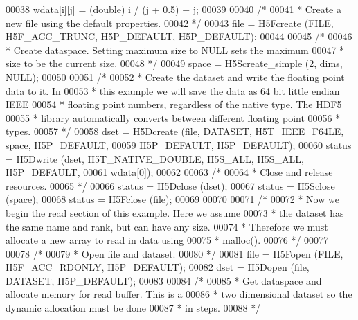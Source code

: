 \begin{DoxyCode}
00038             wdata[i][j] = (\textcolor{keywordtype}{double}) i / (j + 0.5) + j;
00039 
00040     \textcolor{comment}{/*}
00041 \textcolor{comment}{     * Create a new file using the default properties.}
00042 \textcolor{comment}{     */}
00043     file = H5Fcreate (FILE, H5F\_ACC\_TRUNC, H5P\_DEFAULT, H5P\_DEFAULT);
00044 
00045     \textcolor{comment}{/*}
00046 \textcolor{comment}{     * Create dataspace.  Setting maximum size to NULL sets the maximum}
00047 \textcolor{comment}{     * size to be the current size.}
00048 \textcolor{comment}{     */}
00049     space = H5Screate\_simple (2, dims, NULL);
00050 
00051     \textcolor{comment}{/*}
00052 \textcolor{comment}{     * Create the dataset and write the floating point data to it.  In}
00053 \textcolor{comment}{     * this example we will save the data as 64 bit little endian IEEE}
00054 \textcolor{comment}{     * floating point numbers, regardless of the native type.  The HDF5}
00055 \textcolor{comment}{     * library automatically converts between different floating point}
00056 \textcolor{comment}{     * types.}
00057 \textcolor{comment}{     */}
00058     dset = H5Dcreate (file, DATASET, H5T\_IEEE\_F64LE, space, H5P\_DEFAULT,
00059                 H5P\_DEFAULT, H5P\_DEFAULT);
00060     status = H5Dwrite (dset, H5T\_NATIVE\_DOUBLE, H5S\_ALL, H5S\_ALL, H5P\_DEFAULT,
00061                 wdata[0]);
00062 
00063     \textcolor{comment}{/*}
00064 \textcolor{comment}{     * Close and release resources.}
00065 \textcolor{comment}{     */}
00066     status = H5Dclose (dset);
00067     status = H5Sclose (space);
00068     status = H5Fclose (file);
00069 
00070 
00071     \textcolor{comment}{/*}
00072 \textcolor{comment}{     * Now we begin the read section of this example.  Here we assume}
00073 \textcolor{comment}{     * the dataset has the same name and rank, but can have any size.}
00074 \textcolor{comment}{     * Therefore we must allocate a new array to read in data using}
00075 \textcolor{comment}{     * malloc().}
00076 \textcolor{comment}{     */}
00077 
00078     \textcolor{comment}{/*}
00079 \textcolor{comment}{     * Open file and dataset.}
00080 \textcolor{comment}{     */}
00081     file = H5Fopen (FILE, H5F\_ACC\_RDONLY, H5P\_DEFAULT);
00082     dset = H5Dopen (file, DATASET, H5P\_DEFAULT);
00083 
00084     \textcolor{comment}{/*}
00085 \textcolor{comment}{     * Get dataspace and allocate memory for read buffer.  This is a}
00086 \textcolor{comment}{     * two dimensional dataset so the dynamic allocation must be done}
00087 \textcolor{comment}{     * in steps.}
00088 \textcolor{comment}{     */}

\end{DoxyCode}
